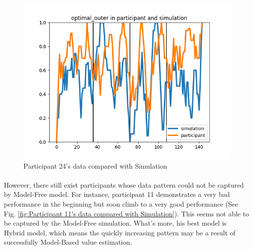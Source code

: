 \begin{figure}[htb]
{\begin{minipage}[t]{0.48\textwidth}
\includegraphics[width=\textwidth]{Figures/24_optimal_outer}
\end{minipage}
}
\decoRule
\caption[Participant 24's data compared with Simulation]{Participant 24's data compared with Simulation}
\label{fig:Participant 24's data compared with Simulation}
\end{figure}


\paragraph{}
However, there still exist participants whose data pattern could not be captured by Model-Free model. For instance, participant 11 demonstrates a very bad performance in the beginning but soon climb to a very good performance (See Fig. \ref{fig:Participant 11's data compared with Simulation}). This seems not able to be captured by the Model-Free simulation. What's more, his best model is Hybrid model, which means the quickly increasing pattern may be a result of successfully Model-Based value estimation. 

